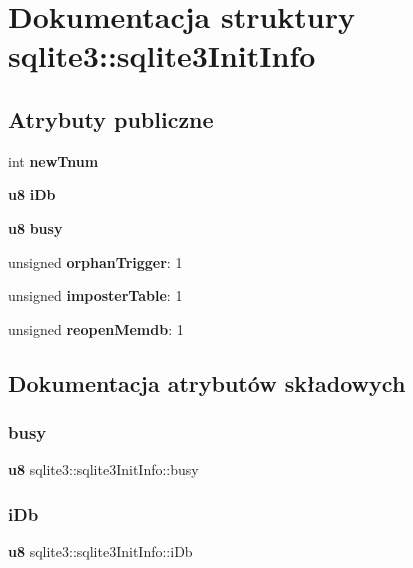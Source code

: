 \section{Dokumentacja struktury sqlite3\+::sqlite3\+Init\+Info}
\label{structsqlite3_1_1sqlite3_init_info}
\subsection*{Atrybuty publiczne}
\begin{DoxyCompactItemize}
\item 
int \textbf{ new\+Tnum}
\item 
\textbf{ u8} \textbf{ i\+Db}
\item 
\textbf{ u8} \textbf{ busy}
\item 
unsigned \textbf{ orphan\+Trigger}\+: 1
\item 
unsigned \textbf{ imposter\+Table}\+: 1
\item 
unsigned \textbf{ reopen\+Memdb}\+: 1
\end{DoxyCompactItemize}


\subsection{Dokumentacja atrybutów składowych}
\mbox{\label{structsqlite3_1_1sqlite3_init_info_a6ac01842e0ae68023cb60fea93bd8688}} 
\subsubsection{busy}
{\footnotesize\ttfamily \textbf{ u8} sqlite3\+::sqlite3\+Init\+Info\+::busy}

\mbox{\label{structsqlite3_1_1sqlite3_init_info_af72389cb54753544c0f578605e6604bb}} 
\subsubsection{iDb}
{\footnotesize\ttfamily \textbf{ u8} sqlite3\+::sqlite3\+Init\+Info\+::i\+Db}

\mbox{\label{structsqlite3_1_1sqlite3_init_info_a0340c57f98fc3ea3b0077e1c6d1e56b0}} 
